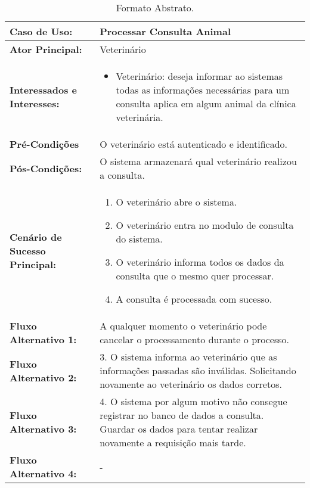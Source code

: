 \documentclass[a4paper, 12pt]{article}
\begin{document}
	\vspace{2cm}

	\begin{table}[H]
		\centering
		\begin{tabular}{p{0.3\linewidth}  p{0.7\linewidth}}
			\toprule
			
			\textbf{Caso de Uso:} & Processar Consulta Animal\\ \midrule
			\textbf{Ator Principal:} & Veterinário \\ \midrule
			\textbf{Interessados e Interesses:} & 
				\begin{itemize}
					\item Veterinário: deseja informar ao sistemas todas as informações necessárias para um consulta aplica em algum animal da clínica veterinária.

				\end{itemize} \\ \midrule
			\textbf{Pré-Condições} & O veterinário está autenticado e identificado. \\ \midrule
			\textbf{Pós-Condições:} & O sistema armazenará qual veterinário realizou a consulta. \\ \midrule
			\textbf{Cenário de Sucesso Principal:} & 
			\begin{enumerate}
				\item O veterinário abre o sistema.
				\item O veterinário entra no modulo de consulta do sistema.
				\item O veterinário informa todos os dados da consulta que o mesmo quer processar.
				\item A consulta é processada com sucesso.
			\end{enumerate} \\ \midrule
			
			\textbf{Fluxo Alternativo 1:} & A qualquer momento o veterinário pode cancelar o processamento durante o processo. \\ \midrule
			\textbf{Fluxo Alternativo 2:} & 3. O sistema informa ao veterinário que as informações passadas são inválidas. Solicitando novamente ao veterinário os dados corretos. \\ \midrule
			\textbf{Fluxo Alternativo 3:} & 4. O sistema por algum motivo não consegue registrar no banco de dados a consulta. Guardar os dados para tentar realizar novamente a requisição mais tarde. \\ \midrule
			\textbf{Fluxo Alternativo 4:} & - \\ 
			
			\bottomrule
		\end{tabular}
		\caption{ {\small Formato Abstrato.}}
	\end{table}
\end{document}
